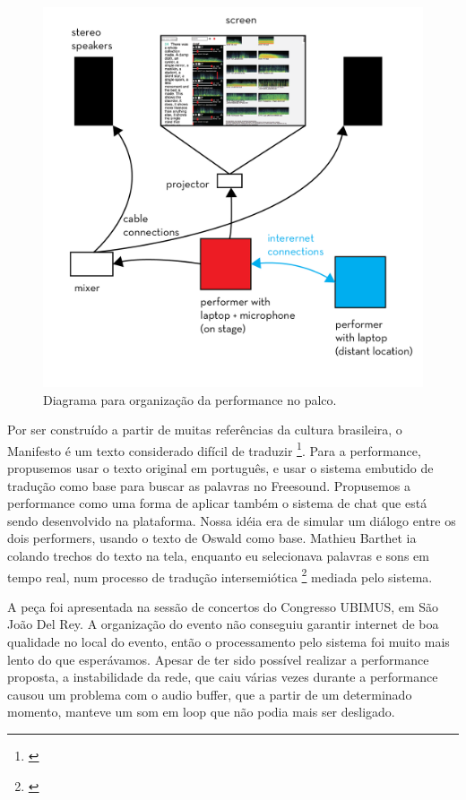 \begin{figure}

\includegraphics[width=1\linewidth]{pictures/cap4/diagrama-cannibal}
\caption{Diagrama para organização da performance no palco.}
\label{diagram}
\end{figure}

Por ser construído a partir de muitas referências da cultura brasileira, o Manifesto é um texto considerado difícil de traduzir \footnote{\cite{Lesli-1991}}. Para a performance, propusemos usar o texto original em português, e usar o sistema embutido de tradução como base para buscar as palavras no Freesound. Propusemos a performance como uma forma de aplicar também o sistema de chat que está sendo desenvolvido na plataforma. Nossa idéia era de simular um diálogo entre os dois performers, usando o texto de Oswald como base. Mathieu Barthet ia colando trechos do texto na tela, enquanto eu selecionava palavras e sons em tempo real, num processo de tradução intersemiótica \footnote{\cite{JulioPlaza1969}} mediada pelo sistema. 

A peça foi apresentada na sessão de concertos do Congresso UBIMUS, em São João Del Rey. A organização do evento não conseguiu garantir internet de boa qualidade no local do evento, então o processamento pelo sistema foi muito mais lento do que esperávamos. Apesar de ter sido possível realizar a performance proposta, a instabilidade da rede, que caiu várias vezes durante a performance causou um problema com o audio buffer, que a partir de um determinado momento, manteve um som em loop que não podia mais ser desligado.

